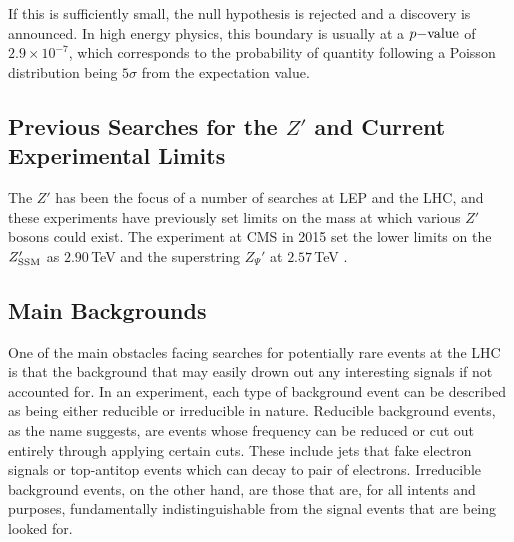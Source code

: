 \documentclass{article}
\begin{document}
If this is sufficiently small, the null hypothesis is rejected and a discovery is announced. In high energy physics, this boundary is usually at a $p\rm{-value}$ of $2.9\times10^{-7}$, which corresponds to the probability of quantity following a Poisson distribution being $5\sigma$ from the expectation value.

\subsection{Previous Searches for the $Z'$ and Current Experimental Limits}%

The $Z'$ has been the focus of a number of searches at LEP and the LHC, and these experiments have previously set limits on the mass at which various $Z'$ bosons could exist. The experiment at CMS in 2015 set the lower limits on the $Z_{\rm{SSM}}'$ as $2.90\,$TeV and the superstring $Z_{\Psi}'$ at $2.57\,$TeV \cite{CMSDileptonSearch}. 

\subsection{Main Backgrounds}%

One of the main obstacles facing searches for potentially rare events at the LHC is that the background that may easily drown out any interesting signals if not accounted for. In an experiment, each type of background event can be described as being either reducible or irreducible in nature. Reducible background events, as the name suggests, are events whose frequency can be reduced or cut out entirely through applying certain cuts. These include jets that fake electron signals or top-antitop events which can decay to pair of electrons. Irreducible background events, on the other hand, are those that are, for all intents and purposes, fundamentally indistinguishable from the signal events that are being looked for. 
\end{document}

